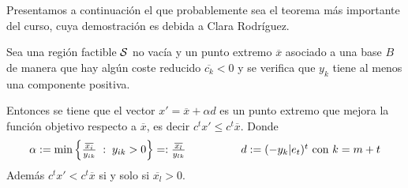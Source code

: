 Presentamos a continuación el que probablemente sea el teorema más importante del curso, cuya demostración es debida a Clara Rodríguez.
\begin{theo}
	\label{fund_teo_mejoraSimplex}
	Sea una región factible $\mathcal{S}$ no vacía y un punto extremo $\overline{x}$ asociado a una base $B$ de manera que hay algún coste reducido $\overline{c_k}<0$ y se verifica que $y_k$ tiene al menos una componente positiva.
	
	Entonces se tiene que el vector $x'=\overline{x}+\alpha d$ es un punto extremo que mejora la función objetivo respecto a $\overline{x}$, es decir $c^tx'\leq c^t\overline{x}$. Donde
	\begin{equation*}
	\begin{array}{cc}
	\alpha:=\min\left\{\frac{\overline{x_i}}{y_{ik}}\;:\; y_{ik}>0\right\}=:\frac{\overline{x_l}}{y_{lk}} \qquad&\qquad d:=(-y_k|e_t)^t\text{ con } k=m+t
	\end{array}
	\end{equation*}
	Además $c^tx'< c^t\overline{x}$ si y solo si $\overline{x_l}>0$.
\end{theo}
